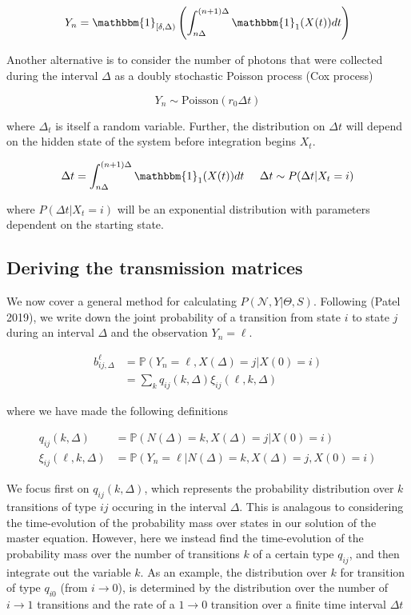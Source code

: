 \documentclass{ucetd}
\begin{document}
\begin{equation*}
Y_{n} = \mathbbm{1}_{[\delta,\Delta)}\left(\int_{n\Delta}^{(n+1)\Delta} \mathbbm{1}_{1} (X(t)) dt\right)
\end{equation*}

Another alternative is to consider the number of photons that were collected during the interval $\Delta$ as a doubly stochastic Poisson process (Cox process)

\begin{equation*}
Y_{n} \sim \mathrm{Poisson}\left(r_{0}\Delta t\right)
\end{equation*}

where $\Delta_{t}$ is itself a random variable. Further, the distribution on $\Delta t$ will depend on the hidden state of the system before integration begins $X_{t}$. 

\begin{equation*}
\Delta t = \int_{n\Delta}^{(n+1)\Delta} \mathbbm{1}_{1} (X(t)) dt \;\;\;\;\;
\Delta t \sim P(\Delta t | X_{t} = i) 
\end{equation*}

where $P(\Delta t | X_{t} = i) $ will be an exponential distribution with parameters dependent on the starting state. 

\subsection{Deriving the transmission matrices}

We now cover a general method for calculating $P(\mathcal{N},Y|\Theta,S)$. Following (Patel 2019), we write down the joint probability of a transition from state $i$ to state $j$ during an interval $\Delta$ and the observation $Y_{n}=\ell$. 

\begin{align*}
b_{ij,\Delta}^{\ell} &= \mathbb{P}(Y_{n}=\ell,X(\Delta)=j|X(0)=i)\\
&= \sum_{k}q_{ij}(k,\Delta)\xi_{ij}(\ell,k,\Delta)
\end{align*}

where we have made the following definitions

\begin{align*}
q_{ij}(k,\Delta) &= \mathbb{P}(N(\Delta)=k,X(\Delta)=j|X(0)=i)\\
\xi_{ij}(\ell,k,\Delta)  &= \mathbb{P}(Y_{n}=\ell|N(\Delta)=k,X(\Delta)=j,X(0)=i)
\end{align*}

We focus first on $q_{ij}(k,\Delta)$, which represents the probability distribution over $k$ transitions of type $ij$ occuring in the interval $\Delta$. This is analagous to considering the time-evolution of the probability mass over states in our solution of the master equation. However, here we instead find the time-evolution of the probability mass over the number of transitions $k$ of a certain type $q_{ij}$, and then integrate out the variable $k$. As an example, the distribution over $k$ for transition of type $q_{i0}$ (from $i\rightarrow 0$), is determined by the distribution over the number of $i\rightarrow 1$ transitions and the rate of a $1\rightarrow 0$ transition over a finite time interval $\Delta t$
\end{document}
